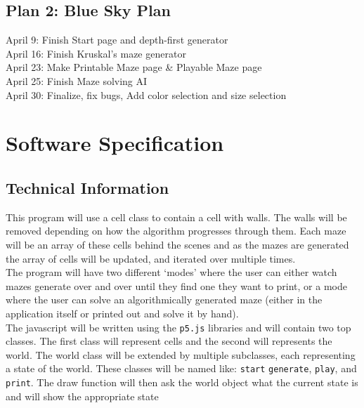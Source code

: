 \documentclass[12 pt]{article}
\begin{document}
\subsection{Plan 2: Blue Sky Plan}
\hspace*{\parindent} April 9: Finish Start page and depth-first generator\\
\hspace*{\parindent} April 16: Finish Kruskal's maze generator\\
\hspace*{\parindent} April 23: Make Printable Maze page \& Playable Maze page\\
\hspace*{\parindent} April 25: Finish Maze solving AI\\
\hspace*{\parindent} April 30: Finalize, fix bugs, Add color selection and size selection\\

\newpage
\section{Software Specification}
\subsection{Technical Information}
\hspace{\parindent} This program will use a cell class to contain a cell with walls. The walls will be removed depending on how the algorithm progresses through them. Each maze will be an array of these cells behind the scenes and as the mazes are generated the array of cells will be updated, and iterated over multiple times. \\
\hspace*{\parindent} The program will have two different `modes' where the user can either watch mazes generate over and over until they find one they want to print, or a mode where the user can solve an algorithmically generated maze (either in the application itself or printed out and solve it by hand). \\
\hspace*{\parindent} The javascript will be written using the \verb|p5.js| libraries and will contain two top classes. The first class will represent cells and the second will represents the world. The world class will be extended by multiple subclasses, each representing a state of the world. These classes will be named like: \verb|start| \verb|generate|, \verb|play|, and \verb|print|. The draw function will then ask the world object what the current state is and will show the appropriate state
\end{document}
